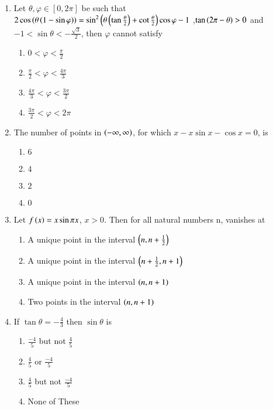 \begin{enumerate}[label=\thesubsection.\arabic*,ref=\thesubsection.\theenumi]
\item Let $\theta, \varphi \in [0,2\pi]$ be such that $2 \cos\left(\theta\left(1-\sin \varphi\right)\right)= \sin^2\left(\theta\left(\tan\frac{\theta}{2}\right)+\cot\frac{\theta}{2}\right)\cos \varphi-1$ ,$\tan\left(2\pi-\theta\right)>0$ and $-1<\sin{\theta}<-\frac{\sqrt{3}}{2}$, then $\varphi$ cannot satisfy \hfill{}
\begin{enumerate}
    \item $0<\varphi<\frac{\pi}{2}$
    \item $\frac{\pi}{2}<\varphi<\frac{4\pi}{3}$
    \item $\frac{4\pi}{3}<\varphi<\frac{3\pi}{2}$
    \item $\frac{3\pi}{2}<\varphi<2\pi$
\end{enumerate}
\item The number of points in $\left(-\infty, \infty\right)$, for which $x - x \sin x - \cos x = 0$, is \hfill{}
\begin{enumerate}
    \item $6$
    \item $4$
    \item $2$
    \item $0$
\end{enumerate}
\item Let $f\left(x\right)=x\sin\pi x $, $ x>0 $. Then for all  natural numbers n,  vanishes at 
\hfill{}
\begin{enumerate}
    \item A unique point in the interval $\left(n,n+\frac{1}{2}\right)$
    \item A unique point in the interval $\left(n+\frac{1}{2},n+1\right)$
    \item A unique point in the interval $\left(n,n+1\right)$
    \item Two points in the interval $\left(n,n+1\right)$
\end{enumerate}
	\item If $\tan\theta =-\frac{4}{3}$ then $\sin \theta$ is 
		
		\hfill{}
		
  
		\begin{enumerate}
				\item $\frac{-4}{5}$ but not $\frac{4}{5}$ 
				\item $\frac{4}{5}$ or $\frac{-4}{5}$ 
				\item $\frac{4}{5}$ but not $\frac{-4}{5}$ 
				\item None of These 
		\end{enumerate}
  

\end{enumerate}
